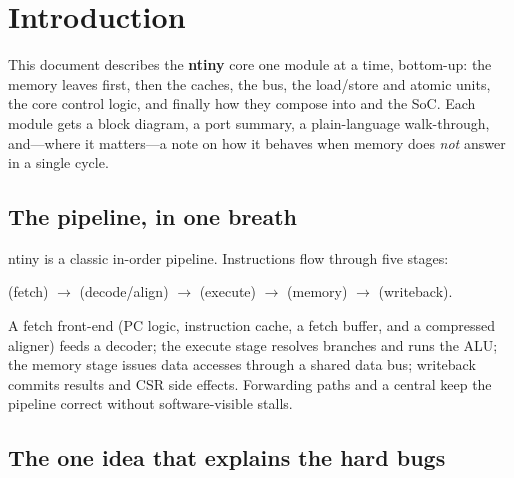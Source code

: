 \section{Introduction}

This document describes the \textbf{ntiny} core one module at a time, bottom-up:
the memory leaves first, then the caches, the bus, the load/store and atomic
units, the core control logic, and finally how they compose into 
and the SoC. Each module gets a block diagram, a port summary, a plain-language
walk-through, and---where it matters---a note on how it behaves when memory does
\emph{not} answer in a single cycle.

\subsection{The pipeline, in one breath}

ntiny is a classic in-order pipeline. Instructions flow through five stages:

\begin{center}
 (fetch) $\rightarrow$  (decode/align) $\rightarrow$
 (execute) $\rightarrow$  (memory) $\rightarrow$
 (writeback).
\end{center}

A fetch front-end (PC logic, instruction cache, a fetch buffer, and a compressed
aligner) feeds a decoder; the execute stage resolves branches and runs the ALU;
the memory stage issues data accesses through a shared data bus; writeback
commits results and CSR side effects. Forwarding paths and a central
 keep the pipeline correct without software-visible stalls.

\subsection{The one idea that explains the hard bugs}


